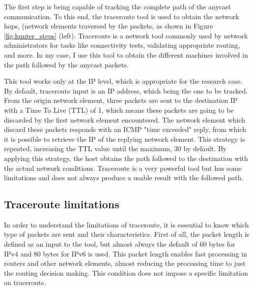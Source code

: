 The first step is being capable of tracking the complete path of the anycast communication. To this end, the traceroute tool is used to obtain the network hops, (network elements traversed by the packets, as shown in Figure \ref{fig:hunter_steps} (left). Traceroute is a network tool commonly used by network administrators for tasks like connectivity tests, validating appropriate routing, and more. In my case, I use this tool to obtain the different machines involved in the path followed by the anycast packets.

This tool works only at the IP level, which is appropriate for the research case. By default, traceroute input is an IP address, which being the one to be tracked. From the origin network element, three packets are sent to the destination IP with a Time To Live (TTL) of 1, which means these packets are going to be discarded by the first network element encountered. The network element which discard these packets responds with an ICMP "time exceeded" reply, from which it is possible to retrieve the IP of the replying network element. This strategy is repeated, increasing the TTL value until the maximum, 30 by default. By applying this strategy, the host obtains the path followed to the destination with the actual network conditions. Traceroute is a very powerful tool but has some limitations and does not always produce a usable result with the followed path.

\subsection{Traceroute limitations}

In order to understand the limitations of traceroute, it is essential to know which type of packets are sent and their characteristics. First of all, the packet length is defined as an input to the tool, but almost always the default of 60 bytes for IPv4 and 80 bytes for IPv6 is used. This packet length enables fast processing in routers and other network elements, almost reducing the processing time to just the routing decision making. This condition does not impose a specific limitation on traceroute.


